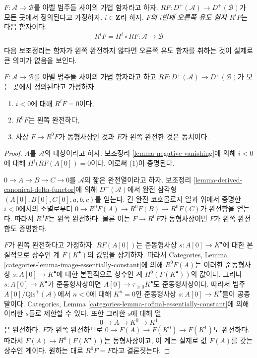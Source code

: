 \begin{definition}
\label{definition-higher-derived-functors}
$F : \mathcal{A} \to \mathcal{B}$를 아벨 범주들 사이의 가법 함자라고
하자. $RF : D^{+}(\mathcal{A}) \to D^{+}(\mathcal{B})$가 모든 곳에서
정의된다고 가정하자. $i \in \mathbf{Z}$라 하자.
{\it $F$의 $i$번째 오른쪽 유도 함자 $R^iF$}는 다음 함자이다.
$$
R^iF = H^i \circ RF :
\mathcal{A}
\longrightarrow
\mathcal{B}
$$
\end{definition}

\noindent
다음 보조정리는 함자가 왼쪽 완전하지 않다면 오른쪽 유도 함자를 취하는
것이 실제로 큰 의미가 없음을 보인다.

\begin{lemma}
\label{lemma-left-exact-higher-derived}
$F : \mathcal{A} \to \mathcal{B}$를 아벨 범주들 사이의 가법 함자라고
하고 $RF : D^{+}(\mathcal{A}) \to D^{+}(\mathcal{B})$가 모든 곳에서
정의된다고 가정하자.
\begin{enumerate}
\item $i < 0$에 대해 $R^iF = 0$이다,
\item $R^0F$는 왼쪽 완전하다,
\item 사상 $F \to R^0F$가 동형사상인 것과 $F$가 왼쪽 완전한 것은
동치이다.
\end{enumerate}
\end{lemma}

\begin{proof}
$A$를 $\mathcal{A}$의 대상이라고 하자. 보조정리
\ref{lemma-negative-vanishing}에 의해
$i < 0$에 대해 $H^i(RF(A[0]) = 0$이다. 이로써 (1)이 증명된다.

\medskip\noindent
$0 \to A \to B \to C \to 0$를 $\mathcal{A}$의 짧은 완전열이라고 하자.
보조정리 \ref{lemma-derived-canonical-delta-functor}에 의해
$D^{+}(\mathcal{A})$에서 완전 삼각형
$(A[0], B[0], C[0], a, b, c)$를 얻는다. 긴 완전 코호몰로지 열과
위에서 증명한 $i < 0$에서의 소멸로부터
$0 \to R^0F(A) \to R^0F(B) \to R^0F(C)$가 완전함을 얻는다.
따라서 $R^0F$는 왼쪽 완전하다. 물론 이는 $F \to R^0F$가
동형사상이면 $F$가 왼쪽 완전함도 증명한다.

\medskip\noindent
$F$가 왼쪽 완전하다고 가정하자. $RF(A[0])$는 준동형사상
$s : A[0] \to K^\bullet$에 대한 본질적으로 상수인 계
$F(K^\bullet)$의 값임을 상기하자. 따라서 Categories, Lemma
\ref{categories-lemma-image-essentially-constant}에 의해
$R^0F(A)$는 이러한 준동형사상 $s : A[0] \to K^\bullet$에 대한
본질적으로 상수인 계 $H^0(F(K^\bullet))$의 값이다.
그러나 $s : A[0] \to K^\bullet$가 준동형사상이면
$A[0] \to \tau_{\geq 0}K^\bullet$도 준동형사상이다.
따라서 범주 $A[0]/\text{Qis}^{+}(\mathcal{A})$에서 $n < 0$에 대해
$K^n = 0$인 준동형사상 $s : A[0] \to K^\bullet$들이 공종말이다.
Categories, Lemma \ref{categories-lemma-cofinal-essentially-constant}에
의해 이러한 $s$들로 제한할 수 있다.
또한 그러한 $s$에 대해 열
$$
0 \to A \to K^0 \to K^1
$$
은 완전하다. $F$가 왼쪽 완전하므로
$0 \to F(A) \to F(K^0) \to F(K^1)$도 완전하다.
따라서 $F(A) \to H^0(F(K^\bullet))$는 동형사상이고, 이 계는 실제로
값 $F(A)$를 갖는 상수인 계이다. 원하는 대로 $R^0F = F$라고 결론짓는다.
\end{proof}

